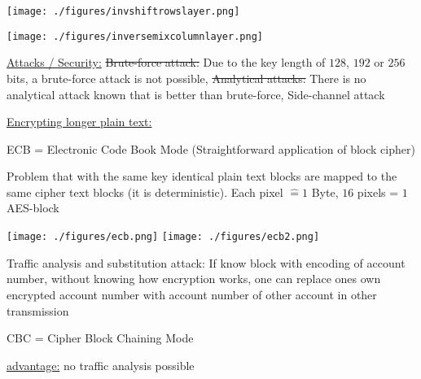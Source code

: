 \documentclass[landscape, a4paper]{article}
\begin{document}
\begin{minipage}[t]{0.2\linewidth}
\begin{betterlist}
		\begin{minipage}[b]{0.5\linewidth}
			\texttt{[image: ./figures/invshiftrowslayer.png]}
		\end{minipage}
		\begin{minipage}[b]{0.5\linewidth}
			\texttt{[image: ./figures/inversemixcolumnlayer.png]}
		\end{minipage}
		\item \underline{Attacks / Security:} \sout{Brute-force attack:} Due to the key length of $128$, $192$ or $256$ bits, a brute-force attack is not possible, \sout{Analytical attacks:} There is no analytical attack known that is better than brute-force, Side-channel attack
	\end{betterlist}
\end{minipage}
\begin{minipage}[t]{0.2\linewidth}
	\begin{betterlist}
		\vspace{-0.2cm}
		\item \underline{Encrypting longer plain text:}
		\begin{betterlist}
			\item \alert{ECB} = Electronic Code Book Mode (Straightforward application of block cipher)
			\begin{betterlist}
				\item Problem that with the same key identical plain text blocks are mapped to the same cipher text blocks (it is deterministic). Each pixel $\hat= 1$ Byte, $16$ pixels = $1$ AES-block
			\end{betterlist}
			\texttt{[image: ./figures/ecb.png]}
			\texttt{[image: ./figures/ecb2.png]}
			\begin{betterlist}
				\item \alert{Traffic analysis and substitution attack:} If know block with encoding of account number, without knowing how encryption works, one can replace ones own encrypted account number with account number of other account in other transmission
			\end{betterlist}
			\item \alert{CBC} = Cipher Block Chaining Mode
			\begin{betterlist}
				\item \underline{advantage:} no \alert{traffic analysis} possible
			\end{betterlist}


\end{betterlist}
\end{betterlist}
\end{minipage}
\end{document}
